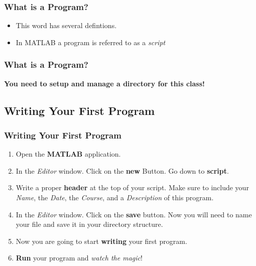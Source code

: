\documentclass[fleqn]{beamer} %
\newcommand{\sectionIIIsubsectionItitle}{What is a Program?}
\newcommand{\sectionIIIsubsectionIItitle}{Writing Your First Program}
\begin{document}
			\begin{frame}
				\frametitle{\sectionIIIsubsectionItitle}
				\bigskip

				\begin{itemize}
					\item This word has several defintions. \\

					\item  In MATLAB a program is referred to as a {\it script}	
				\end{itemize}
					
				\btVFill
			\end{frame}

			\begin{frame}
				\frametitle{\sectionIIIsubsectionItitle}
				\bigskip
				\textbf{ You need to setup and manage a directory for this class!}
				
				\btVFill
			\end{frame}

		\subsection{\sectionIIIsubsectionIItitle}\label{sectionIIIsubsectionII}	

			\begin{frame}
				\frametitle{\sectionIIIsubsectionIItitle}
				\bigskip

				\begin{enumerate}
					\item Open the {\bf MATLAB} application.
					\item In the {\it Editor} window. Click on the {\bf new } Button. Go down to {\bf script}.
					\item Write a proper {\bf header} at the top of your script. Make sure to include your {\it Name}, the {\it Date}, the {\it Course}, and a {\it Description} of this program.
					\item In the {\it Editor} window. Click on the {\bf save} button. Now you will need to name your file and save it in your directory structure.
					\item Now you are going to start {\bf writing} your first program. 
					\item {\bf Run} your program and {\it watch the magic}!
				\end{enumerate}
				
				\btVFill
			\end{frame}
\end{document}
